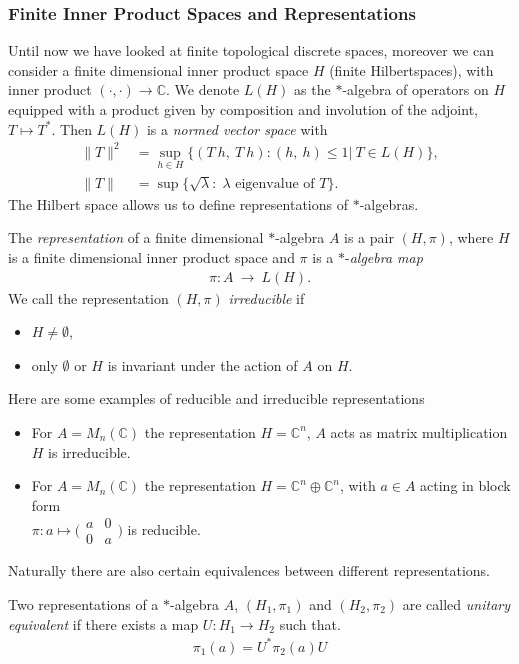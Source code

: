 \subsubsection{Finite Inner Product Spaces and Representations}
Until now we have looked at finite topological discrete spaces, moreover we can consider a
finite dimensional inner product space $H$ (finite Hilbertspaces), with inner product
$(\cdot,\cdot)\rightarrow \mathbb{C}$. We denote $L(H)$ as the $*$-algebra of operators on $H$
equipped with a product given by composition and involution of the adjoint, $T \mapsto T^*$.
Then $L(H)$ is a \textit{normed vector space} with
\begin{align}
    \|T\|^2 &= \sup_{h \in H}\big\{(T\ h,\ T\ h): (h,\ h) \leq 1\big|\ T
    \in L(H)\big \},\\
    \|T\| &= \sup\big\{\sqrt{\lambda}:\; \lambda \text{ eigenvalue of } T\big\}.
\end{align}
The Hilbert space allows us to define representations of $*$-algebras.
\begin{mydefinition}
    The \textit{representation} of a finite dimensional $*$-algebra $A$ is a
    pair $(H, \pi)$, where $H$ is a finite dimensional inner product space
    and $\pi$ is a $*$-\textit{algebra map}
    \begin{align}
        \pi:A\ \rightarrow \ L(H).
    \end{align}
    We call the representation $(H, \pi)$ \textit{irreducible} if
    \begin{itemize}
        \item $H \neq \emptyset$,
        \item only $\emptyset$ or $H$ is invariant under the action of $A$ on
            $H$.
    \end{itemize}
\end{mydefinition}
Here are some examples of reducible and irreducible representations
\begin{itemize}
    \item For $A = M_n(\mathbb{C})$ the representation $H=\mathbb{C}^n$, $A$ acts as matrix multiplication\\
            $H$ is irreducible.
    \item For $A = M_n(\mathbb{C})$ the representation $H=\mathbb{C}^n\oplus \mathbb{C}^n$, with $a \in A$ acting
        in block form \\ $\pi: a \mapsto \big(\begin{smallmatrix} a & 0\\ 0 & a \end{smallmatrix}\big)$ is
            reducible.
\end{itemize}
Naturally there are also certain equivalences between different
representations.
\begin{mydefinition}
Two representations of a $*$-algebra $A$, $(H_1, \pi _1)$ and
$(H_2, \pi _2)$  are called \textit{unitary equivalent} if there exists a map
$U: H_1 \rightarrow H_2$ such that.
    \begin{align}
        \pi _1(a) = U^* \pi _2(a) U
    \end{align}
\end{mydefinition}

